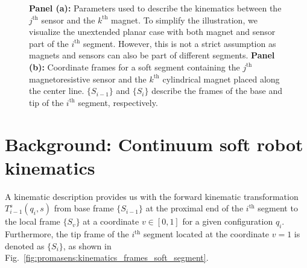 \begin{figure}[t]
\centering
{}
\caption{\textbf{Panel (a):} Parameters used to describe the kinematics between the $j^\mathrm{th}$ sensor and the $k^\mathrm{th}$ magnet. To simplify the illustration, we visualize the unextended planar case with both magnet and sensor part of the $i^\mathrm{th}$ segment. However, this is not a strict assumption as magnets and sensors can also be part of different segments. \textbf{Panel (b):} Coordinate frames for a soft segment containing the $j^\mathrm{th}$ magnetoresistive sensor and the $k^\mathrm{th}$ cylindrical magnet placed along the center line. $\{S_{i-1}\}$ and $\{S_{i}\}$ describe the frames of the base and tip of the $i^\mathrm{th}$ segment, respectively.}
\end{figure}

\section{Background: Continuum soft robot kinematics}\label{sec:promasens:kinematics}
A kinematic description provides us with the forward kinematic transformation $T_{i-1}^s(q_i,s)$ from base frame $\{S_{i-1}\}$ at the proximal end of the $i^\mathrm{th}$ segment to the local frame $\{S_{v}\}$ at a coordinate $v \in [0,1]$ for a given configuration $q_i$. Furthermore, the tip frame of the $i^\mathrm{th}$ segment located at the coordinate $v = 1$ is denoted as $\{S_{i}\}$, as shown in Fig.~\ref{fig:promasens:kinematics_frames_soft_segment}.

